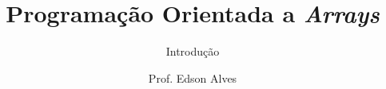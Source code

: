 \title{Programação Orientada a {\it Arrays}}
\subtitle{Introdução}
\date{}
\author{Prof. Edson Alves}
